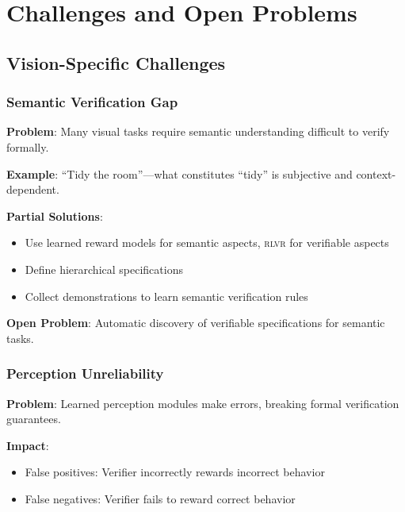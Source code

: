 \documentclass[11pt,a4paper]{article}
\newcommand{\rlvr}{\textsc{rlvr}}
\begin{document}
\section{Challenges and Open Problems}
\label{sec:challenges}

\subsection{Vision-Specific Challenges}
\label{sec:vision_specific_challenges}

\subsubsection{Semantic Verification Gap}

\textbf{Problem}: Many visual tasks require semantic understanding difficult to verify formally.

\textbf{Example}: ``Tidy the room''---what constitutes ``tidy'' is subjective and context-dependent.

\textbf{Partial Solutions}:
\begin{itemize}[leftmargin=*]
    \item Use learned reward models for semantic aspects, \rlvr{} for verifiable aspects
    \item Define hierarchical specifications
    \item Collect demonstrations to learn semantic verification rules
\end{itemize}

\textbf{Open Problem}: Automatic discovery of verifiable specifications for semantic tasks.

\subsubsection{Perception Unreliability}

\textbf{Problem}: Learned perception modules make errors, breaking formal verification guarantees.

\textbf{Impact}:
\begin{itemize}[leftmargin=*]
    \item False positives: Verifier incorrectly rewards incorrect behavior
    \item False negatives: Verifier fails to reward correct behavior
\end{itemize}
\end{document}
